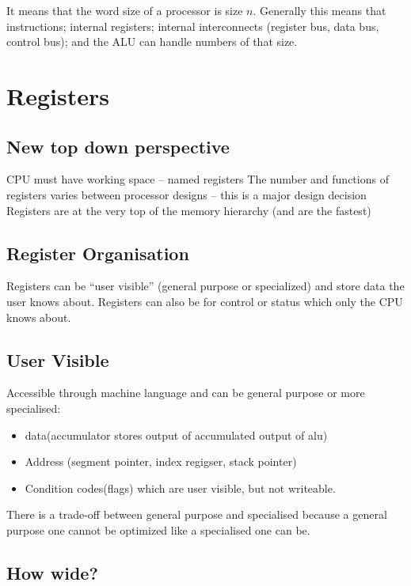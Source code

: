 It means that the word size of a processor is size \(n\).
Generally this means that instructions; internal registers; internal interconnects (register bus, data bus, control bus); and the ALU can handle numbers of that size.

\section{Registers}\label{sec:registers}

\subsection{New top down perspective}\label{sub:new_top_down_perspective}

CPU must have working space -- named registers
The number and functions of registers varies between processor designs -- this is a major design decision
Registers are at the very top of the memory hierarchy (and are the fastest)

\subsection{Register Organisation}\label{sub:register_organisation}

Registers can be ``user visible'' (general purpose or specialized) and store data the user knows about.
Registers can also be for control or status which only the CPU knows about.

\subsection{User Visible}\label{sub:user_visible}

Accessible through machine language and can be general purpose or more specialised:
\begin{itemize}
    \item data(accumulator stores output of accumulated output of alu)
    \item Address (segment pointer, index regigser, stack pointer)
    \item Condition codes(flags) which are user visible, but not writeable.
\end{itemize}
There is a trade-off between general purpose and specialised because a general purpose one cannot be optimized like a specialised one can be.

\subsection{How wide?}\label{sub:how_wide_}

